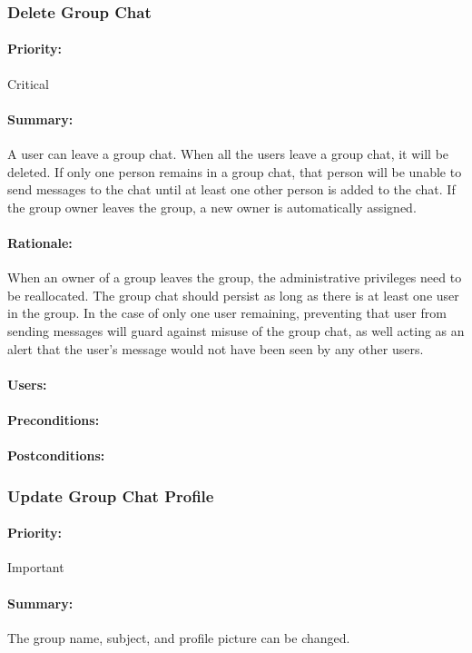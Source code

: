 \documentclass[11pt]{article}
\begin{document}
\subsubsection{Delete Group Chat} \label{UC-delete-group}
\paragraph{Priority:}Critical
\paragraph{Summary:}A user can leave a group chat. When all the users leave a group chat, it will be deleted. If only one person remains in a group chat, that person will be unable to send messages to the chat until at least one other person is added to the chat. If the group owner leaves the group, a new owner is automatically assigned.
\paragraph{Rationale:}When an owner of a group leaves the group, the administrative privileges need to be reallocated. The group chat should persist as long as there is at least one user in the group. In the case of only one user remaining, preventing that user from sending messages will guard against misuse of the group chat, as well acting as an alert that the user's message would not have been seen by any other users.
\paragraph{Users:}
\paragraph{Preconditions:}
\paragraph{{Postconditions:}}

\subsubsection{Update Group Chat Profile} \label{UC-update-group}
\paragraph{Priority:} Important
\paragraph{Summary:}
The group name, subject, and profile picture can be changed.
\end{document}
